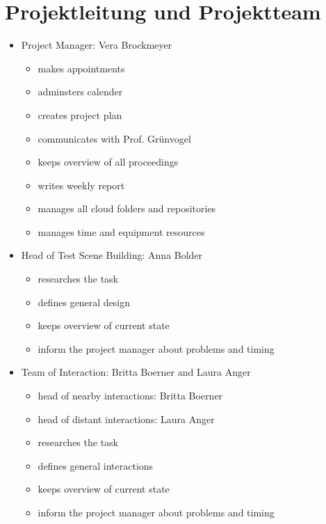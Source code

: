 \documentclass[a4paper, 12pt]{article}
\newcommand{\changefont}[3]{
\fontfamily{#1} \fontseries{#2} \fontshape{#3} \selectfont}
\begin{document}

%


\newpage

\section{Projektleitung und Projektteam}
\begin{itemize}
	\item Project Manager: Vera Brockmeyer
\begin{itemize}
	\item makes appointments
	\item adminsters calender
	\item creates project plan
	\item communicates with Prof. Grünvogel
	\item keeps overview of all proceedings
	\item writes weekly report
	\item manages all cloud folders and repositories
	\item manages time and equipment resources 
\end{itemize}
\item Head of Test Scene Building: Anna Bolder
\begin{itemize}
	\item researches the task
	\item defines general design
	\item keeps overview of current state
	\item inform the project manager about problems and timing
\end{itemize} 
\item Team of Interaction: Britta Boerner and Laura Anger
\begin{itemize}
	\item head  of nearby interactions: Britta Boerner
	\item head of distant interactions: Laura Anger
	\item researches the task
	\item defines general interactions
	\item keeps overview of current state
	\item inform the project manager about problems and timing
\end{itemize} 
\end{itemize}
\end{document}
